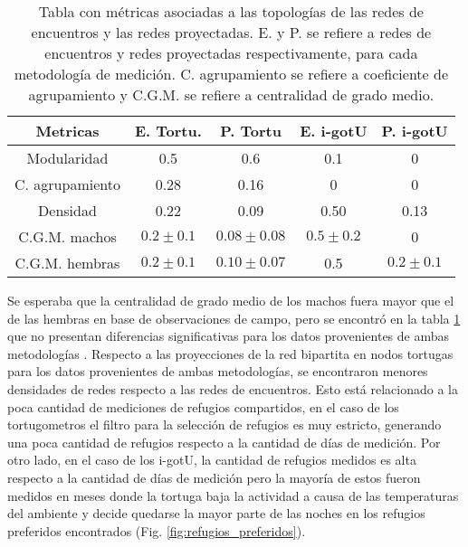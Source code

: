 \begin{table}[ht]
    \centering
    \begin{tabular}{|c|c|c|c|c|}
    \hline
    Metricas          & E. Tortu.   & P. Tortu      & E. i-gotU   & P. i-gotU    \\ \hline
    Modularidad       & 0.5         & 0.6           & 0.1        & 0            \\ \hline
    C. agrupamiento & 0.28        & 0.16          & 0           & 0            \\ \hline
    Densidad          & 0.22        & 0.09          & 0.50         & 0.13          \\ \hline
    C.G.M. machos     & $0.2\pm0.1$ & $0.08\pm0.08$ & $0.5\pm0.2$ & 0            \\ \hline
    C.G.M. hembras    & $0.2\pm0.1$ & $0.10\pm0.07$ & 0.5         & $0.2\pm0.1 $ \\ \hline
    \end{tabular}
    \caption[Tabla con métricas asociadas a las tipologías de las redes de encuentros y las redes proyectadas.]{Tabla con métricas asociadas a las topologías de las redes de encuentros y las redes proyectadas. E. y P. se refiere a redes de encuentros y redes proyectadas respectivamente, para cada metodología de medición. C. agrupamiento se refiere a coeficiente de agrupamiento y C.G.M. se refiere a centralidad de grado medio.}
    \label{tab:metricas_topologia_redes}
\end{table}
Se esperaba que la centralidad de grado medio de los machos fuera mayor que el de las hembras en base de observaciones de campo, pero se encontró en la tabla \ref{tab:metricas_topologia_redes} que no presentan diferencias significativas para los datos provenientes de ambas metodologías \cite{Erika}. Respecto a las proyecciones de la red bipartita en nodos tortugas para los datos provenientes de ambas metodologías, se encontraron menores densidades de redes respecto a las redes de encuentros. Esto está relacionado a la poca cantidad de mediciones de refugios compartidos, en el caso de los tortugometros el filtro para la selección de refugios es muy estricto, generando una poca cantidad de refugios respecto a la cantidad de días de medición. Por otro lado, en el caso de los i-gotU, la cantidad de refugios medidos es alta respecto a la cantidad de días de medición pero la mayoría de estos fueron medidos en meses donde la tortuga baja la actividad a causa de las temperaturas del ambiente y decide quedarse la mayor parte de las noches en los refugios preferidos encontrados (Fig. \ref{fig:refugios_preferidos}).
